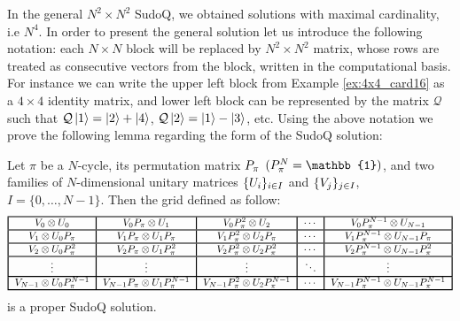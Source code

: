 \documentclass[aps,onecolumn,floatfix,superscriptaddress]{revtex4}
\begin{document}
In the general $N^{2} \times N^{2}$ SudoQ, we obtained solutions with maximal cardinality, i.e $N^{4}$. In order to present the general solution let us introduce the following notation: each $N \times N$ block will be replaced by $N^{2} \times N^{2}$ matrix, whose rows are treated as consecutive vectors from the block, written in the computational basis. 
For instance we can write the upper left block from Example \ref{ex:4x4_card16} as a $4\times 4$ identity matrix, and lower left block can be represented by the matrix $\mathcal{Q}$ such that $\mathcal{Q}\ket{1}=\ket{2}+\ket{4}$, $\mathcal{Q}\ket{2}=\ket{1}-\ket{3}$, etc.
Using the above notation we prove the following lemma regarding the form of the SudoQ solution:
 \begin{lemma}\label{biglemma}
    Let $\pi$ be a $N$-cycle, its permutation matrix $\mathnormal{P}_\pi$ $(\mathnormal{P}_\pi^N=\mathbb{1})$, and two families of $N$-dimensional unitary matrices $\{\mathnormal{U}_i\}_{i\in I}$ and $\{\mathnormal{V}_j\}_{j\in I}$, $I=\{0,\ldots,N-1\}$. Then the grid defined as follow:
    \[
    \begin{tabular}{!{\vrule width 1pt}c!{\vrule width 1pt}c!{\vrule width 1pt}c!{\vrule width 1pt}c!{\vrule width 1pt}c!{\vrule width 1pt}}
    \noalign{\hrule height 1pt}
    $\mathnormal{V}_0\otimes\mathnormal{U}_0$ & $\mathnormal{V}_0\mathnormal{P}_\pi\otimes\mathnormal{U}_1$ & $\mathnormal{V}_0\mathnormal{P}_\pi^2\otimes\mathnormal{U}_2$ & $\cdots$ & $\mathnormal{V}_0\mathnormal{P}_\pi^{N-1}\otimes\mathnormal{U}_{N-1}$ \tabularnewline
    \noalign{\hrule height 1pt}
    $\mathnormal{V}_1\otimes\mathnormal{U}_0\mathnormal{P}_\pi$ & $\mathnormal{V}_1\mathnormal{P}_\pi\otimes\mathnormal{U}_1\mathnormal{P}_\pi$ & $\mathnormal{V}_1\mathnormal{P}_\pi^2\otimes\mathnormal{U}_2\mathnormal{P}_\pi$ & $\cdots$ & $\mathnormal{V}_1\mathnormal{P}_\pi^{N-1}\otimes\mathnormal{U}_{N-1}\mathnormal{P}_\pi$ \tabularnewline
    \noalign{\hrule height 1pt}
    $\mathnormal{V}_2\otimes\mathnormal{U}_0\mathnormal{P}_\pi^2$ & $\mathnormal{V}_2\mathnormal{P}_\pi\otimes\mathnormal{U}_1\mathnormal{P}_\pi^2$ & $\mathnormal{V}_2\mathnormal{P}_\pi^2\otimes\mathnormal{U}_2\mathnormal{P}_\pi^2$ & $\cdots$ & $\mathnormal{V}_2\mathnormal{P}_\pi^{N-1}\otimes\mathnormal{U}_{N-1}\mathnormal{P}_\pi^2$ \tabularnewline
    \noalign{\hrule height 1pt}
    $\vdots$ & $\vdots$ & $\vdots$ & $\ddots$ & $\vdots$ \tabularnewline
    \noalign{\hrule height 1pt}
    $\mathnormal{V}_{N-1}\otimes\mathnormal{U}_0\mathnormal{P}_\pi^{N-1}$ & $\mathnormal{V}_{N-1}\mathnormal{P}_\pi\otimes\mathnormal{U}_1\mathnormal{P}_\pi^{N-1}$ & $\mathnormal{V}_{N-1}\mathnormal{P}_\pi^2\otimes\mathnormal{U}_2\mathnormal{P}_\pi^{N-1}$ & $\cdots$ & $\mathnormal{V}_{N-1}\mathnormal{P}_\pi^{N-1}\otimes\mathnormal{U}_{N-1}\mathnormal{P}_\pi^{N-1}$ \tabularnewline
    \noalign{\hrule height 1pt}
    \end{tabular}
    \]
    is a proper SudoQ solution.
    \end{lemma}
    
\end{document}
